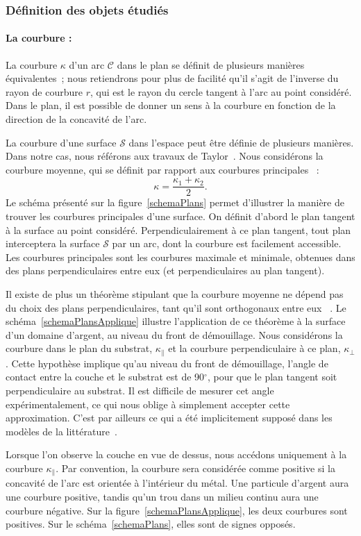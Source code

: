 			\subsubsection{Définition des objets étudiés}
\paragraph*{La courbure :} La courbure $\kappa$ d'un arc $\mathcal{C}$ dans le plan se définit de plusieurs manières équivalentes~; nous retiendrons pour plus de facilité qu'il s'agit de l'inverse du rayon de courbure $r$, qui est le rayon du cercle tangent à l'arc au point considéré. Dans le plan, il est possible de donner un sens à la courbure en fonction de la direction de la concavité de l'arc.\par 
La courbure d'une surface $\mathcal{S}$ dans l'espace peut être définie de plusieurs manières. Dans notre cas, nous référons aux travaux de Taylor~\cite{taylor1992ii}. Nous considérons la courbure moyenne, qui se définit par rapport aux \og courbures principales \fg~:
\begin{equation}
\kappa = \dfrac{\kappa_1+\kappa_2}{2}.
\label{eCourb}
\end{equation}
Le schéma présenté sur la figure~\ref{schemaPlans} permet d'illustrer la manière de trouver les courbures principales d'une surface. On définit d'abord le plan tangent à la surface au point considéré. Perpendiculairement à ce plan tangent, tout plan interceptera la surface $\mathcal{S}$ par un arc, dont la courbure est facilement accessible. Les courbures principales sont les courbures maximale et minimale, obtenues dans des plans perpendiculaires entre eux (et perpendiculaires au plan tangent).\par
Il existe de plus un théorème stipulant que la courbure moyenne ne dépend pas du choix des plans perpendiculaires, tant qu'il sont orthogonaux entre eux ~\cite{taylor1992ii}. Le schéma~\ref{schemaPlansApplique} illustre l'application de ce théorème à la surface d'un domaine d'argent, au niveau du front de démouillage. Nous considérons la courbure dans le plan du substrat, $\kappa_\parallel$ et la courbure perpendiculaire à ce plan, $\kappa_\perp$. Cette hypothèse implique qu'au niveau du front de démouillage, l'angle de contact entre la couche et le substrat est de 90$^\circ$, pour que le plan tangent soit perpendiculaire au substrat. Il est difficile de mesurer cet angle expérimentalement, ce qui nous oblige à simplement accepter cette approximation. C'est par ailleurs ce qui a été implicitement supposé dans les modèles de la littérature~\cite{brandon1966mobility, jiran1990capillary}.\par 
Lorsque l'on observe la couche en vue de dessus, nous accédons uniquement à la courbure $\kappa_\parallel$. Par convention, la courbure sera considérée comme positive si la concavité de l'arc est orientée à l'intérieur du métal. Une particule d'argent aura une courbure positive, tandis qu'un trou dans un milieu continu aura une courbure négative. Sur la figure~\ref{schemaPlansApplique}, les deux courbures sont positives. Sur le schéma~\ref{schemaPlans}, elles sont de signes opposés.\par 

